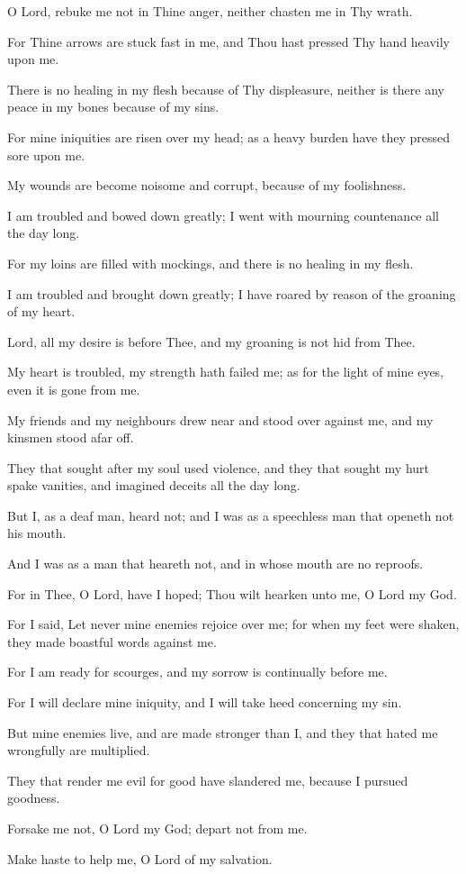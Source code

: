 O Lord, rebuke me not in Thine anger, neither chasten me in Thy wrath.

For Thine arrows are stuck fast in me, and Thou hast pressed Thy hand heavily upon me.

There is no healing in my flesh because of Thy displeasure, neither is there any peace in my bones because of my sins.

For mine iniquities are risen over my head; as a heavy burden have they pressed sore upon me.

My wounds are become noisome and corrupt, because of my foolishness.

I am troubled and bowed down greatly; I went with mourning countenance all the day long.

For my loins are filled with mockings, and there is no healing in my flesh.

I am troubled and brought down greatly; I have roared by reason of the groaning of my heart.

Lord, all my desire is before Thee, and my groaning is not hid from Thee.

My heart is troubled, my strength hath failed me; as for the light of mine eyes, even it is gone from me.

My friends and my neighbours drew near and stood over against me, and my kinsmen stood afar off.

They that sought after my soul used violence, and they that sought my hurt spake vanities, and imagined deceits all the day long.

But I, as a deaf man, heard not; and I was as a speechless man that openeth not his mouth.

And I was as a man that heareth not, and in whose mouth are no reproofs.

For in Thee, O Lord, have I hoped; Thou wilt hearken unto me, O Lord my God.

For I said, Let never mine enemies rejoice over me; for when my feet were shaken, they made boastful words against me.

For I am ready for scourges, and my sorrow is continually before me.

For I will declare mine iniquity, and I will take heed concerning my sin.

But mine enemies live, and are made stronger than I, and they that hated me wrongfully are multiplied.

They that render me evil for good have slandered me, because I pursued goodness.

Forsake me not, O Lord my God; depart not from me.

Make haste to help me, O Lord of my salvation.
